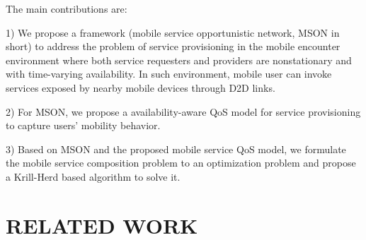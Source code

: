 \documentclass[10pt,journal,compsoc]{IEEEtran}
\begin{document}
The main contributions are:

1) We propose a framework (mobile service opportunistic network, MSON in short) to address the problem of service provisioning in the mobile encounter environment where both service requesters and providers are nonstationary and with time-varying availability. In such environment, mobile user can invoke services exposed by nearby mobile devices through D2D links.

2) For MSON, we propose a availability-aware QoS model for service provisioning to capture users' mobility behavior.

3) Based on MSON and the proposed mobile service QoS model, we formulate the mobile service composition problem to an optimization problem and propose a Krill-Herd based algorithm to solve it. 



\section{RELATED WORK}
\end{document}
